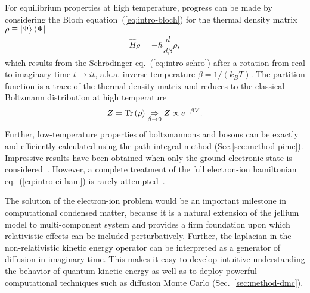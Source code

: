 For equilibrium properties at high temperature, progress can be made by considering the Bloch equation~(\ref{eq:intro-bloch}) for the thermal density matrix $\rho\equiv\ket{\Psi}\bra{\Psi}$
\begin{align} \label{eq:intro-bloch}
\hat{H} \rho = -\hbar\dfrac{d}{d\beta}\rho,
\end{align}
which results from the Schr\"odinger eq.~(\ref{eq:intro-schro}) after a rotation from real to imaginary time $t\rightarrow it$, a.k.a. inverse temperature $\beta=1/(k_BT)$.
The partition function is a trace of the thermal density matrix and reduces to the classical Boltzmann distribution at high temperature
\begin{align}
Z=\text{Tr}\left(\rho\right) \underset{\beta\rightarrow 0}{\Rightarrow} Z \propto e^{-\beta V}.
\end{align}
Further, low-temperature properties of boltzmannons and bosons can be exactly and efficiently calculated using the path integral method (Sec.\ref{sec:method-pimc}). Impressive results have been obtained when only the ground electronic state is considered~\cite{Pierleoni2016b,Celliers2018}.
However, a complete treatment of the full electron-ion hamiltonian eq.~(\ref{eq:intro-ei-ham}) is rarely attempted~\cite{Ceperley1981,Natoli1995}.

The solution of the electron-ion problem would be an important milestone in computational condensed matter, because it is a natural extension of the jellium model to multi-component system and provides a firm foundation upon which relativistic effects can be included perturbatively. Further, the laplacian in the non-relativistic kinetic energy operator can be interpreted as a generator of diffusion in imaginary time. This makes it easy to develop intuitive understanding the behavior of quantum kinetic energy as well as to deploy powerful computational techniques such as diffusion Monte Carlo (Sec.~\ref{sec:method-dmc}).


